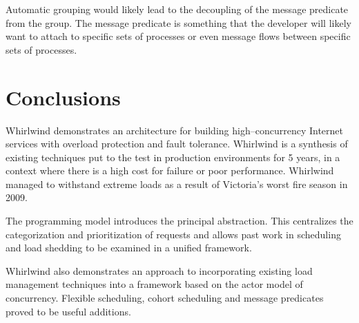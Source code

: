 \documentclass[conference]{IEEEtran}
\begin{document}
Automatic grouping would likely lead to the decoupling of the message predicate from the group. The message predicate is something that the developer will likely want to attach to specific sets of processes or even message flows between specific sets of processes.

\section{Conclusions}

Whirlwind demonstrates an architecture for building high--concurrency Internet services with overload protection and fault tolerance. Whirlwind is a synthesis of existing techniques put to the test in production environments for 5 years, in a context where there is a high cost for failure or poor performance. Whirlwind managed to withstand extreme loads as a result of Victoria's worst fire season in 2009.

The programming model introduces the principal abstraction. This centralizes the categorization and prioritization of requests and allows past work in scheduling and load shedding to be examined in a unified framework.

Whirlwind also demonstrates an approach to incorporating existing load management techniques into a framework based on the actor model of concurrency. Flexible scheduling, cohort scheduling and message predicates proved to be useful additions.



\end{document}
